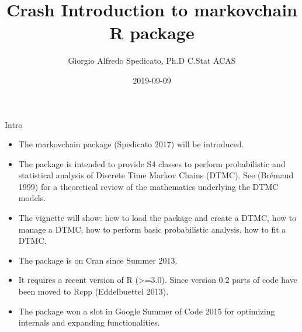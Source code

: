 \documentclass[ignorenonframetext,]{beamer}
\title{Crash Introduction to markovchain R package}
\author{Giorgio Alfredo Spedicato, Ph.D C.Stat ACAS}
\date{2019-09-09}
\providecommand{\tightlist}{%
  \setlength{\itemsep}{0pt}\setlength{\parskip}{0pt}}
\providecommand{\tightlist}{
  \setlength{\itemsep}{0pt}\setlength{\parskip}{0pt}
}
\begin{document}
\frame{\titlepage}

\begin{frame}
\tableofcontents[hideallsubsections]
\end{frame}
\begin{frame}

\end{frame}

\begin{frame}{Intro}
\protect\hypertarget{intro}{}

\begin{itemize}
\tightlist
\item
  The markovchain package (Spedicato 2017) will be introduced.
\item
  The package is intended to provide S4 classes to perform probabilistic
  and statistical analysis of Discrete Time Markov Chains (DTMC). See
  (Brémaud 1999) for a theoretical review of the mathematics underlying
  the DTMC models.
\item
  The vignette will show: how to load the package and create a DTMC, how
  to manage a DTMC, how to perform basic probabilistic analysis, how to
  fit a DTMC.
\end{itemize}

\end{frame}

\begin{frame}

\begin{itemize}
\tightlist
\item
  The package is on Cran since Summer 2013.
\item
  It requires a recent version of R (\textgreater{}=3.0). Since version
  0.2 parts of code have been moved to Rcpp (Eddelbuettel 2013).
\item
  The package won a slot in Google Summer of Code 2015 for optimizing
  internals and expanding functionalities.
\end{itemize}

\end{frame}
\end{document}
